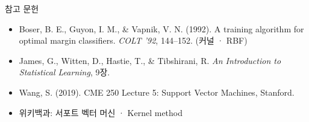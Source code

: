 \documentclass[aspectratio=169,11pt,t]{beamer}
\newcommand{\paperlink}[1]{\href{#1}{\textcolor{ksablue}{\faLink}}}
\begin{document}
\begin{frame}{참고 문헌}
\vfill
\small
\begin{itemize}
\setlength{\itemsep}{0.45em}
\item Boser, B. E., Guyon, I. M., \& Vapnik, V. N. (1992). A training algorithm for optimal margin classifiers. \textit{COLT '92}, 144--152. \;(커널 · RBF) \paperlink{https://doi.org/10.1145/130385.130401}
\item James, G., Witten, D., Hastie, T., \& Tibshirani, R. \textit{An Introduction to Statistical Learning}, 9장. \paperlink{https://doi.org/10.1007/978-1-0716-1418-1}
\item Wang, S. (2019). CME 250 Lecture 5: Support Vector Machines, Stanford. \paperlink{https://web.stanford.edu/class/cme250/files/cme250_lecture5.pdf}
\item 위키백과: 서포트 벡터 머신 \paperlink{https://ko.wikipedia.org/wiki/\%EC\%84\%9C\%ED\%8F\%AC\%ED\%8A\%B8_\%EB\%B2\%A1\%ED\%84\%B0_\%EB\%A8\%B8\%EC\%8B\%A0} \;·\; Kernel method \paperlink{https://en.wikipedia.org/wiki/Kernel_method}
\end{itemize}
\vfill
{}
\end{frame}
\end{document}
